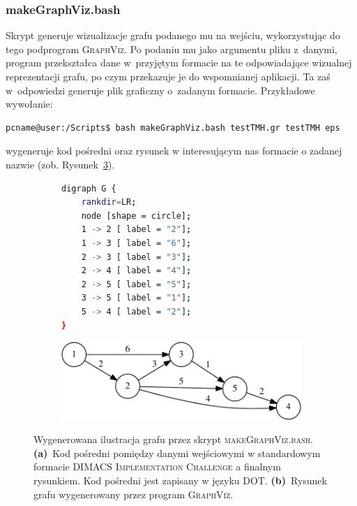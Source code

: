 \subsubsection{makeGraphViz.bash}


Skrypt generuje wizualizacje grafu podanego mu na wejściu, wykorzystując do tego podprogram \textsc{GraphViz}.
Po podaniu mu jako argumentu pliku z~danymi, program przekształca dane w~przyjętym formacie na te odpowiadające wizualnej reprezentacji grafu, po czym przekazuje je do wspomnianej aplikacji.
Ta zaś w~odpowiedzi generuje plik graficzny o~zadanym formacie.
Przykładowe wywołanie:

\begin{lstlisting}[language=bash]
pcname@user:/Scripts$ bash makeGraphViz.bash testTMH.gr testTMH eps
\end{lstlisting}
wygeneruje kod pośredni oraz rysunek w interesującym nas formacie o zadanej nazwie (zob. Rysunek~\ref{fig:graphViz}).

\begin{figure}[!htbp]
	\null\hfill
	\begin{subfigure}[b]{0.49\textwidth}
		\footnotesize
		\begin{lstlisting}[language=bash]
digraph G {
	rankdir=LR;
	node [shape = circle];
	1 -> 2 [ label = "2"];
	1 -> 3 [ label = "6"];
	2 -> 3 [ label = "3"];
	2 -> 4 [ label = "4"];
	2 -> 5 [ label = "5"];
	3 -> 5 [ label = "1"];
	5 -> 4 [ label = "2"];
}
		\end{lstlisting}
		\caption{}
		\label{fig:graphViz:a}
	\end{subfigure}
	\hfill
	\begin{subfigure}[b]{0.49\textwidth}
		\includegraphics[width=\textwidth]{Appendix_I/GRAPH-VIZ-Example/a.pdf}
		\vspace{1em}
		\caption{}
		\label{fig:graphViz:b}
	\end{subfigure}
	\hfill\null
	\caption{
		Wygenerowana ilustracja grafu przez skrypt \textsc{makeGraphViz.bash}.
		\textbf{(a)}~Kod pośredni pomiędzy danymi wejściowymi w standardowym formacie \textsc{DIMACS Implementation Challenge} a finalnym rysunkiem. Kod pośredni jest zapisany w języku \textsc{DOT}.
		\textbf{(b)}~Rysunek grafu wygenerowany przez program \textsc{GraphViz}.
	}
	\label{fig:graphViz}
\end{figure}

